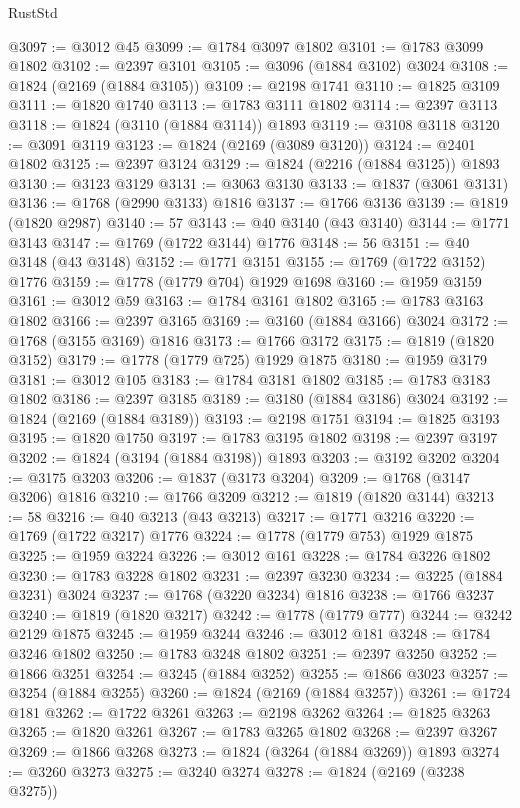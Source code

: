 \begin{lexlean}{RustStd}
\begin{coremodule}
@3097 := @3012 @45
@3099 := @1784 @3097 @1802
@3101 := @1783 @3099 @1802
@3102 := @2397 @3101
@3105 := @3096 (@1884 @3102) @3024
@3108 := @1824 (@2169 (@1884 @3105))
@3109 := @2198 @1741
@3110 := @1825 @3109
@3111 := @1820 @1740
@3113 := @1783 @3111 @1802
@3114 := @2397 @3113
@3118 := @1824 (@3110 (@1884 @3114)) @1893
@3119 := @3108 @3118
@3120 := @3091 @3119
@3123 := @1824 (@2169 (@3089 @3120))
@3124 := @2401 @1802
@3125 := @2397 @3124
@3129 := @1824 (@2216 (@1884 @3125)) @1893
@3130 := @3123 @3129
@3131 := @3063 @3130
@3133 := @1837 (@3061 @3131)
@3136 := @1768 (@2990 @3133) @1816
@3137 := @1766 @3136
@3139 := @1819 (@1820 @2987)
@3140 := 57
@3143 := @40 @3140 (@43 @3140)
@3144 := @1771 @3143
@3147 := @1769 (@1722 @3144) @1776
@3148 := 56
@3151 := @40 @3148 (@43 @3148)
@3152 := @1771 @3151
@3155 := @1769 (@1722 @3152) @1776
@3159 := @1778 (@1779 @704) @1929 @1698
@3160 := @1959 @3159
@3161 := @3012 @59
@3163 := @1784 @3161 @1802
@3165 := @1783 @3163 @1802
@3166 := @2397 @3165
@3169 := @3160 (@1884 @3166) @3024
@3172 := @1768 (@3155 @3169) @1816
@3173 := @1766 @3172
@3175 := @1819 (@1820 @3152)
@3179 := @1778 (@1779 @725) @1929 @1875
@3180 := @1959 @3179
@3181 := @3012 @105
@3183 := @1784 @3181 @1802
@3185 := @1783 @3183 @1802
@3186 := @2397 @3185
@3189 := @3180 (@1884 @3186) @3024
@3192 := @1824 (@2169 (@1884 @3189))
@3193 := @2198 @1751
@3194 := @1825 @3193
@3195 := @1820 @1750
@3197 := @1783 @3195 @1802
@3198 := @2397 @3197
@3202 := @1824 (@3194 (@1884 @3198)) @1893
@3203 := @3192 @3202
@3204 := @3175 @3203
@3206 := @1837 (@3173 @3204)
@3209 := @1768 (@3147 @3206) @1816
@3210 := @1766 @3209
@3212 := @1819 (@1820 @3144)
@3213 := 58
@3216 := @40 @3213 (@43 @3213)
@3217 := @1771 @3216
@3220 := @1769 (@1722 @3217) @1776
@3224 := @1778 (@1779 @753) @1929 @1875
@3225 := @1959 @3224
@3226 := @3012 @161
@3228 := @1784 @3226 @1802
@3230 := @1783 @3228 @1802
@3231 := @2397 @3230
@3234 := @3225 (@1884 @3231) @3024
@3237 := @1768 (@3220 @3234) @1816
@3238 := @1766 @3237
@3240 := @1819 (@1820 @3217)
@3242 := @1778 (@1779 @777)
@3244 := @3242 @2129 @1875
@3245 := @1959 @3244
@3246 := @3012 @181
@3248 := @1784 @3246 @1802
@3250 := @1783 @3248 @1802
@3251 := @2397 @3250
@3252 := @1866 @3251
@3254 := @3245 (@1884 @3252)
@3255 := @1866 @3023
@3257 := @3254 (@1884 @3255)
@3260 := @1824 (@2169 (@1884 @3257))
@3261 := @1724 @181
@3262 := @1722 @3261
@3263 := @2198 @3262
@3264 := @1825 @3263
@3265 := @1820 @3261
@3267 := @1783 @3265 @1802
@3268 := @2397 @3267
@3269 := @1866 @3268
@3273 := @1824 (@3264 (@1884 @3269)) @1893
@3274 := @3260 @3273
@3275 := @3240 @3274
@3278 := @1824 (@2169 (@3238 @3275))

\end{coremodule}
\end{lexlean}
